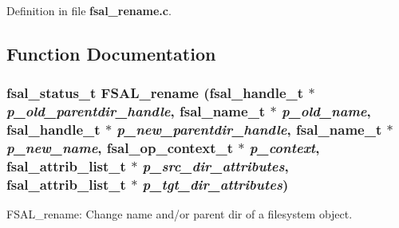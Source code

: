 Definition in file {\bf fsal\_\-rename.c}.

\subsection{Function Documentation}
\subsubsection{\setlength{\rightskip}{0pt plus 5cm}fsal\_\-status\_\-t FSAL\_\-rename (fsal\_\-handle\_\-t $\ast$ {\em p\_\-old\_\-parentdir\_\-handle}, fsal\_\-name\_\-t $\ast$ {\em p\_\-old\_\-name}, fsal\_\-handle\_\-t $\ast$ {\em p\_\-new\_\-parentdir\_\-handle}, fsal\_\-name\_\-t $\ast$ {\em p\_\-new\_\-name}, fsal\_\-op\_\-context\_\-t $\ast$ {\em p\_\-context}, fsal\_\-attrib\_\-list\_\-t $\ast$ {\em p\_\-src\_\-dir\_\-attributes}, fsal\_\-attrib\_\-list\_\-t $\ast$ {\em p\_\-tgt\_\-dir\_\-attributes})}\label{fsal__rename_8c_a0}


FSAL\_\-rename: Change name and/or parent dir of a filesystem object.

